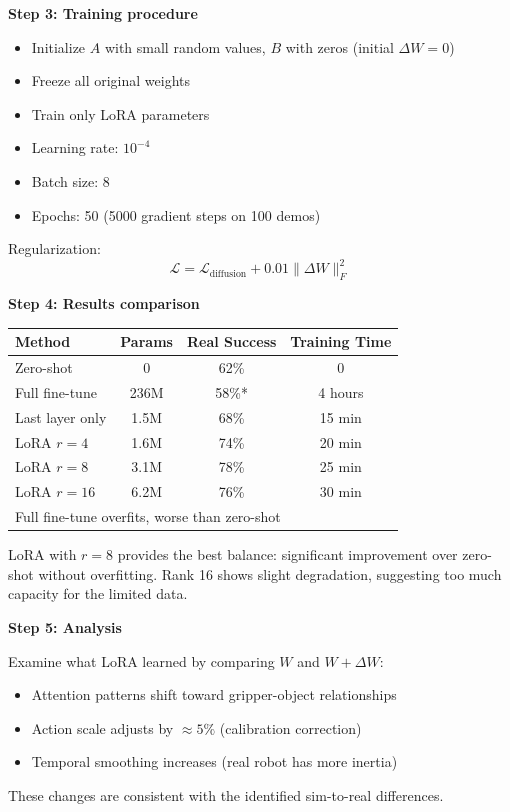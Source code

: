 \begin{example}
\textbf{Step 3: Training procedure}

\begin{itemize}
    \item Initialize $A$ with small random values, $B$ with zeros (initial $\Delta W = 0$)
    \item Freeze all original weights
    \item Train only LoRA parameters
    \item Learning rate: $10^{-4}$
    \item Batch size: 8
    \item Epochs: 50 (5000 gradient steps on 100 demos)
\end{itemize}

Regularization:
\begin{equation}
\mathcal{L} = \mathcal{L}_{\text{diffusion}} + 0.01 \|\Delta W\|_F^2
\end{equation}

\textbf{Step 4: Results comparison}

\begin{center}
\begin{tabular}{lccc}
\toprule
\textbf{Method} & \textbf{Params} & \textbf{Real Success} & \textbf{Training Time} \\
\midrule
Zero-shot & 0 & 62\% & 0 \\
Full fine-tune & 236M & 58\%* & 4 hours \\
Last layer only & 1.5M & 68\% & 15 min \\
LoRA $r=4$ & 1.6M & 74\% & 20 min \\
LoRA $r=8$ & 3.1M & 78\% & 25 min \\
LoRA $r=16$ & 6.2M & 76\% & 30 min \\
\bottomrule
\multicolumn{4}{l}{\small *Full fine-tune overfits, worse than zero-shot}
\end{tabular}
\end{center}

LoRA with $r=8$ provides the best balance: significant improvement over zero-shot without overfitting. Rank 16 shows slight degradation, suggesting too much capacity for the limited data.

\textbf{Step 5: Analysis}

Examine what LoRA learned by comparing $W$ and $W + \Delta W$:
\begin{itemize}
    \item Attention patterns shift toward gripper-object relationships
    \item Action scale adjusts by $\approx 5\%$ (calibration correction)
    \item Temporal smoothing increases (real robot has more inertia)
\end{itemize}

These changes are consistent with the identified sim-to-real differences.
\end{example}

